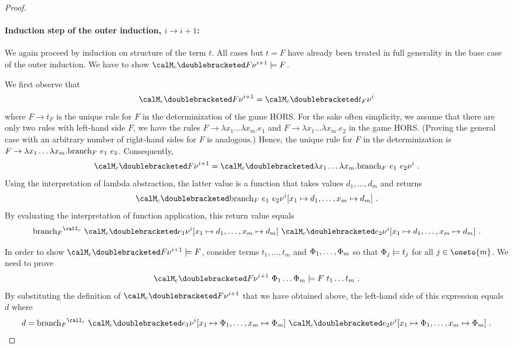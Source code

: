 \documentclass[../../diss.tex]{subfiles}
\begin{document}
\begin{proof}
    \paragraph{Induction step of the outer induction, $i \to i+1$:}

        We again proceed by induction on structure of the term $t$.
        All cases but $t = F$ have already been treated in full
        generality in the base case of the outer induction.
        We have to show $\semc{F}{\val^{i+1}}\gamesound F$.

        We first observe that
        \[
            \semc{F}{\val^{i+1}}
            =
            \semc{t_F}{\val^{i}}
        \]
        where $F \to t_F$ is the unique rule for $F$ in the determinization of the game HORS.\@
        For the sake often simplicity, we assume that there are only two rules with left-hand side $F$, \ie we have the rules
        $F \to \lambda x_1 \ldots \lambda x_m.e_1$ and $F \to \lambda x_1 \ldots \lambda x_m.e_2$ in the game HORS.\@
        (Proving the general case with an arbitrary number of right-hand sides for $F$ is analogous.)
        Hence, the unique rule for $F$ in the determinization is $F \to \lambda x_1 \ldots \lambda x_m. \text{branch}_F \  e_1 \  e_2$.
        Consequently,
        \[
            \semc{F}{\val^{i+1}}
            =
            \semc{\lambda x_1 \ldots \lambda x_m. \brancht_F \appl e_1 \appl e_2}{\val^{i}}
            \ .
        \]
        Using the interpretation of lambda abstraction, the latter value is a function that takes values $d_1, \ldots, d_m$ and returns
        \[
            \semc{\brancht_F \appl e_1 \appl e_2}{\val^{i} [x_1 \mapsto d_1, \ldots, x_m \mapsto d_m]}
            \ .
        \]
        By evaluating the interpretation of function application, this return value equals
        \[
            {\brancht_F}^{\interpretationc}
            \appl
            \semc{e_1}{\val^{i} [x_1 \mapsto d_1, \ldots, x_m \mapsto d_m]}
            \appl
            \semc{e_2}{\val^{i} [x_1 \mapsto d_1, \ldots, x_m \mapsto d_m]}
            \ .
        \]

        In order to show $\semc{F}{\val^{i+1}}\gamesound F$, consider terms $t_1, \ldots, t_m$ and $\Phi_1, \ldots, \Phi_m$ so that $\Phi_j \models t_j$ for all $j \in \oneto{m}$.
        We need to prove
        \[
            \semc{F}{\val^{i+1}} \appl \judgment_1  \ldots \judgment_m
            \gamesound
            F \appl t_1 \ldots t_m
            \ .
        \]
        By substituting the definition of $\semc{F}{\val^{i+1}}$ that we have obtained above, the left-hand side of this expression equals $d$ where
        \[
            d =
            {\brancht_F}^{\interpretationc}
            \appl
            \semc{e_1}{\val^{i} [x_1 \mapsto \judgment_1, \ldots, x_m \mapsto \judgment_m]}
            \appl
            \semc{e_2}{\val^{i} [x_1 \mapsto \judgment_1, \ldots, x_m \mapsto \judgment_m]}
            \ .
        \]


\end{proof}
\end{document}
